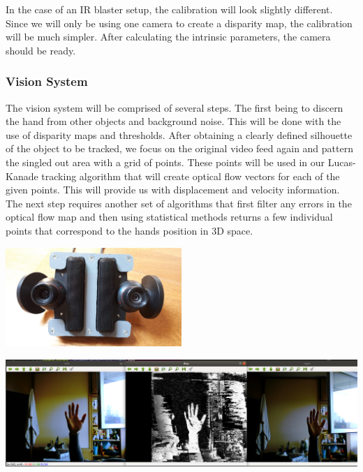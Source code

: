 \documentclass{article}
\begin{document}
In the case of an IR blaster setup, the calibration will look slightly different. Since we will only be using one camera to create a disparity map, the calibration will be much simpler. After calculating the intrinsic parameters, the camera should be ready.
\subsubsection{Vision System}
The vision system will be comprised of several steps. The first being to discern the hand from other objects and background noise. This will be done with the use of disparity maps and thresholds. After obtaining a clearly defined silhouette of the object to be tracked, we focus on the original video feed again and pattern the singled out area with a grid of points. These points will be used in our Lucas-Kanade tracking algorithm that will create optical flow vectors for each of the given points. This will provide us with displacement and velocity information. The next step requires another set of algorithms that first filter any errors in the optical flow map and then using statistical methods returns a few individual points that correspond to the hands position in 3D space.


\begin{center}
\includegraphics[width=0.5\textwidth]{IMG/DualCam.jpeg}

\includegraphics[width=\textwidth]{IMG/DualCam_Disp.PNG}
\end{center}
\end{document}
